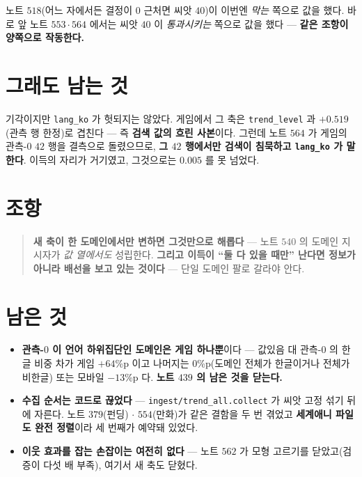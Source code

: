 \documentclass[11pt]{article}
\begin{document}
노트 $518$(어느 자에서든 결정이 $0$ 근처면 씨앗 $40$)이 이번엔 \emph{막는}
쪽으로 값을 했다. 바로 앞 노트 $553 \cdot 564$ 에서는 씨앗 $40$ 이
\emph{통과시키는} 쪽으로 값을 했다 --- \textbf{같은 조항이 양쪽으로 작동한다.}

\section*{그래도 남는 것}

기각이지만 \texttt{lang\_ko} 가 헛되지는 않았다. 게임에서 그 축은
\texttt{trend\_level} 과 \textbf{$+0.519$}(관측 행 한정)로 겹친다 --- 즉
\textbf{검색 값의 흐린 사본}이다. 그런데 노트 $564$ 가 게임의 관측-$0$
$42$ 행을 결측으로 돌렸으므로, \textbf{그 $42$ 행에서만 검색이 침묵하고
\texttt{lang\_ko} 가 말한다}. 이득의 자리가 거기였고, 그것으로는
$0.005$ 를 못 넘었다.

\section*{조항}

\begin{quote}
\textbf{새 축이 한 도메인에서만 변하면 그것만으로 해롭다} --- 노트 $540$ 의
도메인 지시자가 \emph{값 열에서도} 성립한다. \textbf{그리고 이득이 ``둘 다
있을 때만'' 난다면 정보가 아니라 배선을 보고 있는 것이다} --- 단일 도메인
팔로 갈라야 안다.
\end{quote}

\section*{남은 것}

\begin{itemize}
\item \textbf{관측-$0$ 이 언어 하위집단인 도메인은 게임 하나뿐}이다 ---
값있음 대 관측-$0$ 의 한글 비중 차가 게임 $+64$\%p 이고 나머지는
$0$\%p(도메인 전체가 한글이거나 전체가 비한글) 또는 모바일 $-13$\%p 다.
\textbf{노트 $439$ 의 남은 것을 닫는다.}
\item \textbf{수집 순서는 코드로 끊었다} --- \texttt{ingest/trend\_all.collect}
가 씨앗 고정 섞기 뒤에 자른다. 노트 $379$(펀딩) $\cdot$ $554$(만화)가 같은
결함을 두 번 겪었고 \textbf{세계애니 파일도 완전 정렬}이라 세 번째가 예약돼
있었다.
\item \textbf{이웃 효과를 잡는 손잡이는 여전히 없다} --- 노트 $562$ 가
모형 고르기를 닫았고(검증이 다섯 배 부족), 여기서 새 축도 닫혔다.
\end{itemize}
\end{document}
